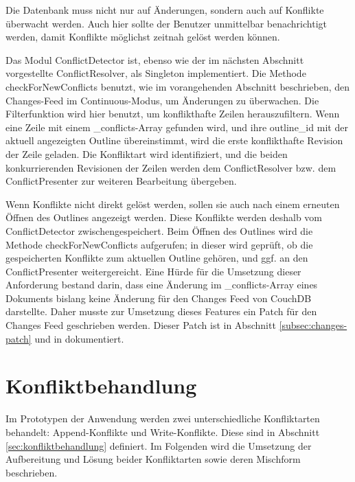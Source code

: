 Die Datenbank muss nicht nur auf Änderungen, sondern auch auf Konflikte überwacht werden. Auch hier sollte der Benutzer unmittelbar benachrichtigt werden, damit Konflikte möglichst zeitnah gelöst werden können.

Das Modul {\selectfont ConflictDetector} ist, ebenso wie der im nächsten Abschnitt vorgestellte {\selectfont Con\-flictResolver}, als Singleton implementiert. Die Methode {\selectfont checkForNewConflicts} benutzt, wie im vorangehenden Abschnitt beschrieben, den Changes-Feed im Continuous-Modus, um Änderungen zu überwachen. Die Filterfunktion wird hier benutzt, um konflikthafte Zeilen herauszufiltern. Wenn eine Zeile mit einem {\selectfont \_conflicts}-Array gefunden wird, und ihre {\selectfont outline\_id} mit der aktuell angezeigten Outline übereinstimmt, wird die erste konflikthafte Revision der Zeile geladen. Die Konfliktart wird identifiziert, und die beiden konkurrierenden Revisionen der Zeilen werden dem {\selectfont ConflictResolver} bzw. dem {\selectfont ConflictPresenter} zur weiteren Bearbeitung übergeben. 

Wenn Konflikte nicht direkt gelöst werden, sollen sie auch nach einem erneuten Öffnen des Outlines angezeigt werden. Diese Konflikte werden deshalb vom {\selectfont ConflictDetector} zwischengespeichert. Beim Öffnen des Outlines wird die Methode {\selectfont checkForNewConflicts} aufgerufen; in dieser wird geprüft, ob die gespeicherten Konflikte zum aktuellen Outline gehören, und ggf. an den {\selectfont ConflictPresenter} weitergereicht. Eine Hürde für die Umsetzung dieser Anforderung bestand darin, dass eine Änderung im {\selectfont \_conflicts}-Array eines Dokuments bislang keine Änderung für den Changes Feed von CouchDB darstellte. Daher musste zur Umsetzung dieses Features ein Patch für den Changes Feed geschrieben werden. Dieser Patch \cite{jira:changesfeed} ist in Abschnitt \ref{subsec:changes-patch} und in \cite{github:changesfeed} dokumentiert. 







\section{Konfliktbehandlung}

Im Prototypen der Anwendung werden zwei unterschiedliche Konfliktarten behandelt: Append-Konflikte und Write-Konflikte. Diese sind in Abschnitt \ref{sec:konfliktbehandlung} definiert. Im Folgenden wird die Umsetzung der Aufbereitung und Lösung beider Konfliktarten sowie deren Mischform beschrieben.


